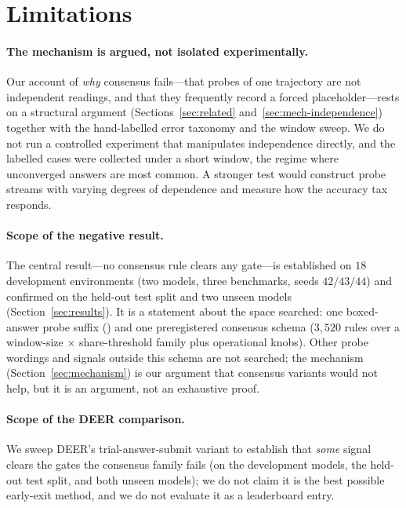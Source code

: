 \section*{Limitations}
\label{sec:limitations}

\paragraph{The mechanism is argued, not isolated experimentally.}
Our account of \emph{why} consensus fails---that probes of one trajectory are not
independent readings, and that they frequently record a forced placeholder---rests
on a structural argument (Sections~\ref{sec:related}
and~\ref{sec:mech-independence}) together with the
hand-labelled error taxonomy and the window sweep. We do not run a controlled
experiment that manipulates independence directly, and the labelled cases were
collected under a short window, the regime where unconverged answers are most
common. A stronger test would construct probe streams with varying degrees of
dependence and measure how the accuracy tax responds.

\paragraph{Scope of the negative result.}
The central result---no consensus rule clears any gate---is established on $18$
development environments (two models, three benchmarks, seeds $42/43/44$) and
confirmed on the held-out test split and two unseen models
(Section~\ref{sec:results}). It is a statement about the space searched: one
boxed-answer probe suffix (\simplek{}) and one preregistered consensus schema
($3{,}520$ rules over a window-size $\times$ share-threshold family plus
operational knobs). Other probe wordings and signals outside this schema are not
searched; the mechanism (Section~\ref{sec:mechanism}) is our argument that
consensus variants would not help, but it is an argument, not an exhaustive
proof.

\paragraph{Scope of the DEER comparison.}
We sweep DEER's trial-answer-submit variant to establish that \emph{some} signal
clears the gates the consensus family fails (on the development models, the
held-out test split, and both unseen models); we do not claim it is the best
possible early-exit method, and we do not evaluate it as a leaderboard entry.

